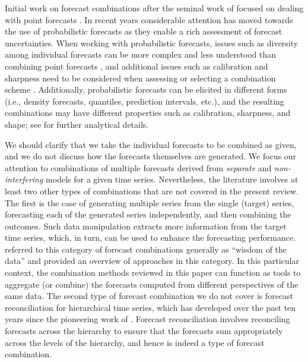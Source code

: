 \documentclass[a4paper,11pt]{article}
\begin{document}
Initial work on forecast combinations after the seminal work of \citet{Bates1969-yj} focused on dealing with point forecasts \citep[see, for example,][]{Clemen1989-fb,Timmermann2006-en}. In recent years considerable attention has moved towards the use of probabilistic forecasts \citep[e.g.,][]{Hall2007-lh,Gneiting2013-hl,Kapetanios2015-bb,Martin2021-yi} as they enable a rich assessment of forecast uncertainties. When working with probabilistic forecasts, issues such as diversity among individual forecasts can be more complex and less understood than combining point forecasts \citep{Ranjan2010-jl}, and additional issues such as calibration and sharpness need to be considered when assessing or selecting a combination scheme \citep{Gneiting2007-fr}. Additionally, probabilistic forecasts can be elicited in different forms (i.e., density forecasts, quantiles, prediction intervals, etc.), and the resulting combinations may have different properties such as calibration, sharpness, and shape; see \citet{Lichtendahl2013-rt} for further analytical details.

We should clarify that we take the individual forecasts to be combined as given, and we do not discuss how the forecasts themselves are generated. We focus our attention to combinations of multiple forecasts derived from \textit{separate} and \textit{non-interfering} models for a given time series. Nevertheless, the literature involves at least two other types of combinations that are not covered in the present review. The first is the case of generating multiple series from the single (target) series, forecasting each of the generated series independently, and then combining the outcomes. Such data manipulation extracts more information from the target time series, which, in turn, can be used to enhance the forecasting performance. \citet{Petropoulos2021-wisdom} referred to this category of forecast combinations generally as ``wisdom of the data'' and provided an overview of approaches in this category. In this particular context, the combination methods reviewed in this paper can function as tools to aggregate (or combine) the forecasts computed from different perspectives of the same data. The second type of forecast combination we do not cover is forecast reconciliation for hierarchical time series, which has developed over the past ten years since the pioneering work of \citet{Hyndman2011-sd}. Forecast reconciliation involves reconciling forecasts across the hierarchy to ensure that the forecasts sum appropriately across the levels of the hierarchy, and hence is indeed a type of forecast combination.
\end{document}
